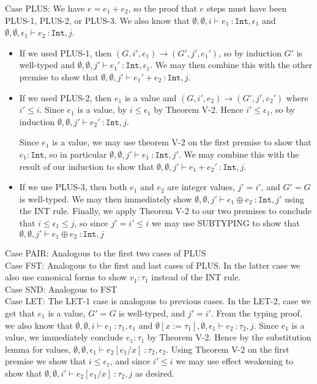 \documentclass{article}
\begin{document}
Case PLUS: We have $e = e_1 + e_2$, so the proof that $e$ steps must have been PLUS-1, PLUS-2, or PLUS-3. We also know that $\emptyset, \emptyset, i \vdash e_1\ \colon \texttt{Int}, \epsilon_1$ and $\emptyset, \emptyset, \epsilon_1 \vdash e_2\ \colon \texttt{Int}, j$.
\begin{itemize}
	\item If we used PLUS-1, then $(G, i', e_1) \rightarrow (G', j', e_1')$, so by induction $G'$ is well-typed and $\emptyset, \emptyset, j' \vdash e_1'\ \colon \texttt{Int}, \epsilon_1$. We may then combine this with the other premise to show that $\emptyset, \emptyset, j' \vdash e_1' + e_2\ \colon \texttt{Int}, j$.
	\item If we used PLUS-2, then $e_1$ is a value and $(G, i', e_2) \rightarrow (G', j', e_2')$ where $i' \leq i$. Since $e_1$ is a value, by $i \leq \epsilon_1$ by Theorem V-2. Hence $i' \leq \epsilon_1$, so by induction $\emptyset, \emptyset, j' \vdash e_2'\ \colon \texttt{Int}, j$.
	
	Since $e_1$ is a value, we may use theorem V-2 on the first premise to show that $e_1 : \texttt{Int}$, so in particular $\emptyset, \emptyset, j' \vdash e_1\ \colon \texttt{Int}, j'$. We may combine this with the result of our induction to show that $\emptyset, \emptyset, j' \vdash e_1 + e_2'\ \colon \texttt{Int}, j$.
	\item If we use PLUS-3, then both $e_1$ and $e_2$ are integer values, $j' = i'$, and $G' = G$ is well-typed. We may then immediately show $\emptyset, \emptyset, j' \vdash e_1 \oplus e_2\ \colon \texttt{Int}, j'$ using the INT rule. Finally, we apply Theorem V-2 to our two premises to conclude that $i \leq \epsilon_1 \leq j$, so since $j' = i' \leq i$ we may use SUBTYPING to show that $\emptyset, \emptyset, j' \vdash e_1 \oplus e_2\ \colon \texttt{Int}, j$
\end{itemize}

Case PAIR: Analogous to the first two cases of PLUS
\\

Case FST: Analogous to the first and last cases of PLUS. In the latter case we also use canonical forms to show $v_1 : \tau_1$ instead of the INT rule.
\\

Case SND: Analogous to FST
\\

Case LET: The LET-1 case is analogous to previous cases. In the LET-2, case we get that $e_1$ is a value, $G' = G$ is well-typed, and $j' = i'$. From the typing proof, we also know that $\emptyset, \emptyset, i \vdash e_1\ \colon \tau_1, \epsilon_1$ and $\emptyset[x := \tau_1], \emptyset, \epsilon_1 \vdash e_2\ \colon \tau_2, j$. Since $e_1$ is a value, we immediately conclude $e_1 : \tau_1$ by Theorem V-2. Hence by the substitution lemma for values, $\emptyset, \emptyset, \epsilon_1 \vdash e_2[e_1/x]\ \colon \tau_2, \epsilon_2$. Using Theorem V-2 on the first premise we show that $i \leq \epsilon_1$, and since $i' \leq i$ we may use effect weakening to show that $\emptyset, \emptyset, i' \vdash e_2[e_1/x]\ \colon \tau_2, j$ as desired.
\\
\end{document}
